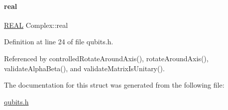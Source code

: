 \mbox{\label{structComplex_a479ad939835457595fcca3ca55c06283}} 
\paragraph{\texorpdfstring{real}{real}}
{\footnotesize\ttfamily \mbox{\hyperlink{precision_8h_a4b654506f18b8bfd61ad2a29a7e38c25}{R\+E\+AL}} Complex\+::real}



Definition at line 24 of file qubits.\+h.



Referenced by controlled\+Rotate\+Around\+Axis(), rotate\+Around\+Axis(), validate\+Alpha\+Beta(), and validate\+Matrix\+Is\+Unitary().



The documentation for this struct was generated from the following file\+:\begin{DoxyCompactItemize}
\item 
\mbox{\hyperlink{qubits_8h}{qubits.\+h}}\end{DoxyCompactItemize}
